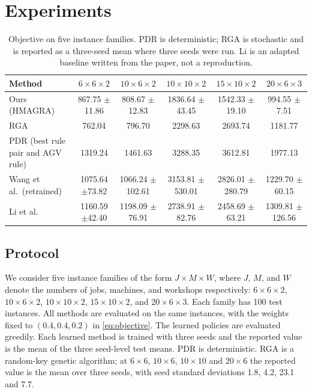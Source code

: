 \section{Experiments}

\label{sec:experiments}

\begin{table}[t]
\centering
\caption{Objective on five instance families. PDR is deterministic; RGA is
stochastic and is reported as a three-seed mean where three seeds were run.
Li is an adapted baseline written from the paper, not a reproduction.}
\label{tab:baselines}
\begin{tabular}{lccccc}
\toprule
Method & $6\times6\times2$ & $10\times6\times2$ & $10\times10\times2$ & $15\times10\times2$ & $20\times6\times3$ \\
\midrule
Ours (HMAGRA) & 867.75 {\scriptsize$\pm$11.86} & 808.67 {\scriptsize$\pm$12.83} & 1836.64 {\scriptsize$\pm$43.45} & 1542.33 {\scriptsize$\pm$19.10} & 994.55 {\scriptsize$\pm$7.51} \\
RGA & 762.04 & 796.70 & 2298.63 & 2693.74 & 1181.77 \\
PDR (best rule pair and AGV rule) & 1319.24 & 1461.63 & 3288.35 & 3612.81 & 1977.13 \\
Wang et al.~(retrained) & 1075.64 {\scriptsize$\pm$73.82} & 1066.24 {\scriptsize$\pm$102.61} & 3153.81 {\scriptsize$\pm$530.01} & 2826.01 {\scriptsize$\pm$280.79} & 1229.70 {\scriptsize$\pm$60.15} \\
Li et al. & 1160.59 {\scriptsize$\pm$42.40} & 1198.09 {\scriptsize$\pm$76.91} & 2738.91 {\scriptsize$\pm$82.76} & 2458.69 {\scriptsize$\pm$63.21} & 1309.81 {\scriptsize$\pm$126.56} \\
\bottomrule
\end{tabular}
\end{table}

\subsection{Protocol}

We consider five instance families of the form $J \times M \times W$, where $J$, $M$, and $W$ denote 
the numbers of jobs, machines, and workshops respectively: $6 \times 6 \times 2$, $10 \times 6 \times 2$, 
$10 \times 10 \times 2$, $15 \times 10 \times 2$, and $20 \times 6 \times 3$.
Each family has 100 test instances. All methods are evaluated on the same instances, with the weights fixed to
$(0.4,0.4,0.2)$ in \eqref{eq:objective}. The learned policies are evaluated
greedily. Each learned method is trained with three seeds and the reported value
is the mean of the three seed-level test means. PDR is deterministic. RGA is a
random-key genetic algorithm; at $6\times6$, $10\times6$, $10\times10$ and
$20\times6$ the reported value is the mean over three seeds, with seed standard
deviations 1.8, 4.2, 23.1 and 7.7.

